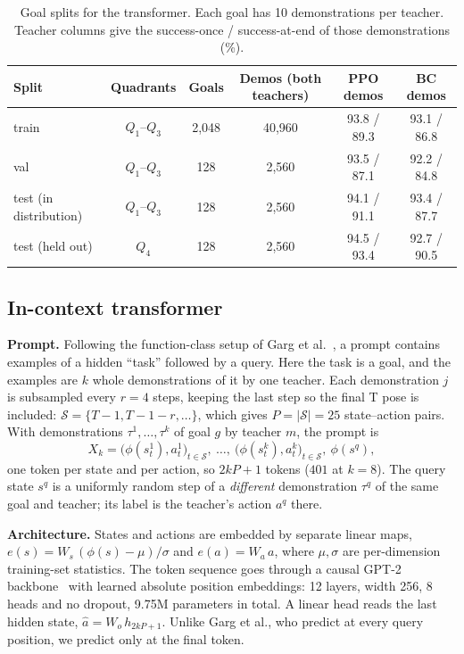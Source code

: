 \begin{table}[h]
\centering
\caption{Goal splits for the transformer. Each goal has 10 demonstrations per teacher. Teacher columns give the success-once /
success-at-end of those demonstrations (\%).}
\label{tab:splits}
\begin{tabular}{lccccc}
\toprule
Split & Quadrants & Goals & Demos (both teachers) & PPO demos & BC demos \\
\midrule
train & $Q_1$--$Q_3$ & 2{,}048 & 40{,}960 & 93.8 / 89.3 & 93.1 / 86.8 \\
val & $Q_1$--$Q_3$ & 128 & 2{,}560 & 93.5 / 87.1 & 92.2 / 84.8 \\
test (in distribution) & $Q_1$--$Q_3$ & 128 & 2{,}560 & 94.1 / 91.1 & 93.4 / 87.7 \\
test (held out) & $Q_4$ & 128 & 2{,}560 & 94.5 / 93.4 & 92.7 / 90.5 \\
\bottomrule
\end{tabular}
\end{table}

\subsection{In-context transformer}
\label{sec:icl-model}

\textbf{Prompt.} Following the function-class setup of Garg et al.~\cite{garg2022can}, a prompt contains examples of a hidden
``task'' followed by a query. Here the task is a goal, and the examples are $k$ whole demonstrations of it by one teacher.
Each demonstration $j$ is subsampled every $r = 4$ steps, keeping the last step so the final T pose is included:
$\mathcal{S} = \{T-1, T-1-r, \dots\}$, which gives $P = |\mathcal{S}| = 25$ state--action pairs. With demonstrations
$\tau^1,\dots,\tau^k$ of goal $g$ by teacher $m$, the prompt is
\begin{equation}
  X_k = \big(\phi(s^1_{t}), a^1_{t}\big)_{t \in \mathcal{S}},\ \dots,\ \big(\phi(s^k_{t}), a^k_{t}\big)_{t \in \mathcal{S}},\ \phi(s^q),
  \label{eq:prompt}
\end{equation}
one token per state and per action, so $2kP + 1$ tokens ($401$ at $k = 8$). The query state $s^q$ is a uniformly random step of a
\emph{different} demonstration $\tau^q$ of the same goal and teacher; its label is the teacher's action $a^q$ there.

\textbf{Architecture.} States and actions are embedded by separate linear maps,
$e(s) = W_s\,(\phi(s) - \mu)/\sigma$ and $e(a) = W_a\,a$, where $\mu, \sigma$ are per-dimension training-set statistics. The token
sequence goes through a causal GPT-2 backbone~\cite{radford2019gpt2} with learned absolute position embeddings: 12 layers, width 256,
8 heads and no dropout, 9.75M parameters in total. A linear head reads the last hidden state,
$\hat a = W_o\, h_{2kP+1}$. Unlike Garg et al., who predict at every query position, we predict only at the final token.

